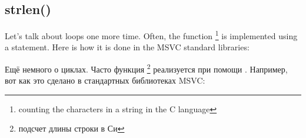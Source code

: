 ﻿\subsection{strlen()}

\ifdefined\ENGLISH
Let's talk about loops one more time. Often, the  
function
\footnote{counting the characters in a string in the C language} 
is implemented using a  statement.
Here is how it is done in the MSVC standard libraries:
\fi

\ifdefined\RUSSIAN
Ещё немного о циклах. Часто функция 
\footnote{подсчет длины строки в Си}
реализуется при помощи .
Например, вот как это сделано в стандартных библиотеках MSVC:
\fi



\EN{}
\RU{}

\EN{}
\RU{}
